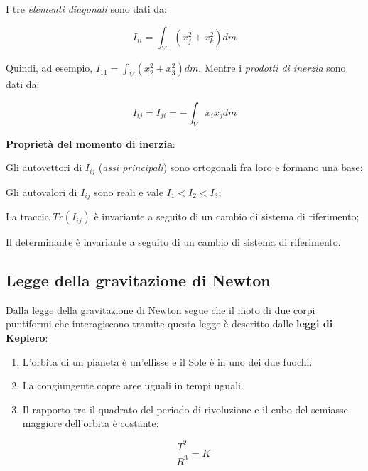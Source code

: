 \documentclass[a4paper,12pt]{book}
\begin{document}
\begin{itemize}
    I tre \textit{elementi diagonali} sono dati da:
    
    \begin{equation}
        I_{ii} = \int_V (x_j^2 + x_k^2) dm
    \end{equation}
    
    Quindi, ad esempio, $I_{11} = \int_V (x_2^2 + x_3^2) dm$.
    Mentre i \textit{prodotti di inerzia} sono dati da:
    
    \begin{equation}
        I_{ij} = I_{ji} = - \int_V x_ix_j dm
    \end{equation}

    \textbf{Proprietà del momento di inerzia}:

    Gli autovettori di $I_{ij}$ (\textit{assi principali}) sono ortogonali fra loro e formano una base;

    Gli autovalori di $I_{ij}$ sono reali e vale $I_1 < I_2 < I_3$;

    La traccia $Tr(I_{ij})$ è invariante a seguito di un cambio di sistema di riferimento;

    Il determinante è invariante a seguito di un cambio di sistema di riferimento.

    \end{itemize}

\subsection{\textcolor{colore7}{Legge della gravitazione di Newton}}

Dalla legge della gravitazione di Newton segue che il moto di due corpi puntiformi che interagiscono tramite questa legge è descritto dalle \textbf{leggi di Keplero}:

\begin{enumerate}
    \item L'orbita di un pianeta è un'ellisse e il Sole è in uno dei due fuochi.
    \item La congiungente copre aree uguali in tempi uguali.
    \item Il rapporto tra il quadrato del periodo di rivoluzione e il cubo del semiasse maggiore dell'orbita è costante:

    \begin{equation}
        \frac{T^2}{R^3} = K
    \end{equation}
    
\end{enumerate}
\end{document}
